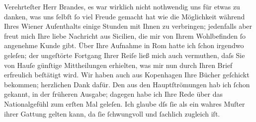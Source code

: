 \pstart{}Verehrteſter Herr Brandes,\pend\vspace{0.5em}
\pstart
           es war wirklich nicht nothwendig uns für etwas zu danken, was uns ſelbſt ſo viel
               Freude gemacht hat wie die Möglichkeit während Ihres Wiener Aufenthalts einige Stunden mit Ihnen zu verbringen; jedenfalls aber
               freut mich Ihre liebe Nachricht aus Sicilien, die
               mir von Ihrem Wohlbefinden ſo ange{\pb}nehme Kunde
               gibt. Über Ihre Aufnahme in Rom hatte ich ſchon
               irgendwo geleſen; der ungeſtörte Fortgang Ihrer Reiſe ließ mich auch vermuthen, daſs
               Sie von Hauſe günſtige Mittheilungen erhielten, was mir nun durch Ihren Brief
               erfreulich beſtätigt wird. Wir haben auch aus Kopenhagen Ihre Bücher geſchickt bekommen; herzlichen Dank dafür. Den
                  \label{K_L00787-1v}\label{K_L00787-1} aus den Hauptſtrömungen hab ich ſchon gekannt, in der
               früheren {\pb}Ausgabe; dagegen habe ich Ihre Rede über das Nationalgefühl
               zum erſten Mal geleſen. Ich glaube dſs ſie als ein wahres Muſter ihrer Gattung gelten
               kann, da ſie ſchwungvoll und ſachlich zugleich iſt.\pend
           
